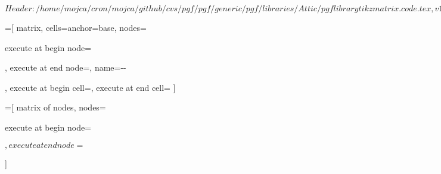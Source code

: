 %
%
%

\ProvidesFileRCS[v\pgfversion] $Header: /home/mojca/cron/mojca/github/cvs/pgf/pgf/generic/pgf/libraries/Attic/pgflibrarytikzmatrix.code.tex,v 1.1 2007/01/02 20:13:02 tantau Exp $

=[%
   matrix,%
   cells={anchor=base},%
   nodes={%
     execute at begin node=\strut,%
     execute at end node=,
     name=\tikzmatrixname-\the\pgfmatrixcurrentrow-\the\pgfmatrixcurrentcolumn%
   },
   execute at begin cell=\tikz@lib@matrix@start@cell,%
   execute at end cell=\tikz@lib@matrix@end@cell%
]

\newif\iftikz@lib@matrix@plain

\def\tikz@lib@matrix@start@cell{\pgfutil@ifnextchar\let{\tikz@lib@matrix@check}{\tikz@lib@matrix@plainfalse\node\bgroup}}%

\def\tikz@lib@matrix@check#1{%
  \pgfutil@ifnextchar\tikz@signal@path{\tikz@lib@matrix@plaintrue\let}{\tikz@lib@matrix@plainfalse\node\bgroup\let}%
}
  
\def\tikz@lib@matrix@end@cell{%
  \iftikz@lib@matrix@plain%
  \else%
    \expandafter\egroup\expandafter;%
  \fi%
}

=[%
  matrix of nodes,
  nodes={%
   execute at begin node=\strut$,%
   execute at end node=$%
  }%
]


\endinput
